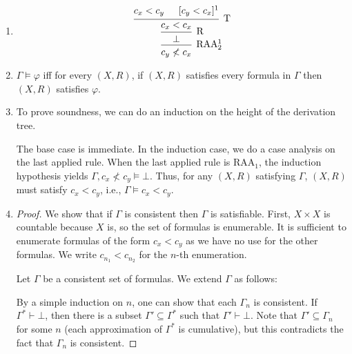 \documentclass[a4paper]{article}
\newcommand{\N}{\mathbb{N}}
\begin{document}
\section{}
\begin{enumerate}
\item
  \[\begin{prooftree}
      \hypo{c_{x} < c_{y}}
      \hypo{[c_{y} < c_{x}]^1}
      \infer2[T]{c_{x} < c_{x}}
      \infer1[R]{\bot}
      \infer1[RAA$_{2}^1$]{c_{y} \nless c_{x}}
    \end{prooftree}\]
\item
  $\Gamma \vDash \varphi$ iff for every $(X,R)$, if $(X,R)$ satisfies every formula in $\Gamma$ then $(X,R)$ satisfies $\varphi$.
\item To prove soundness, we can do an induction on the height of the derivation tree.
  
  The base case is immediate.
  In the induction case, we do a case analysis on the last applied rule.
  When the last applied rule is $\text{RAA}_{1}$, the induction hypothesis yields $\Gamma,c_{x} \nless c_{y} \vDash \bot$.
  Thus, for any $(X,R)$ satisfying $\Gamma$, $(X,R)$ must satisfy $c_{x} < c_{y}$, i.e., $\Gamma \vDash c_{x} < c_{y}$.
\item 
  \begin{proof}
    We show that if $\Gamma$ is consistent then $\Gamma$ is satisfiable.
    First, $X \times X$ is countable because $X$ is, so the set of formulas is enumerable.
    It is sufficient to enumerate formulas of the form $c_{x} < c_{y}$ as we have no use for the other formulas.
    We write $c_{n_1} < c_{n_2}$ for the $n$-th enumeration.

    Let $\Gamma$ be a consistent set of formulas.
    We extend $\Gamma$ as follows:
    By a simple induction on $n$, one can show that each $\Gamma_{n}$ is consistent.
    If $\Gamma^{*} \vdash \bot$, then there is a subset $\Gamma' \subseteq \Gamma^{*}$ such that $\Gamma' \vdash \bot$.
    Note that $\Gamma' \subseteq \Gamma_{n}$ for some $n$ (each approximation of $\Gamma^{*}$ is cumulative), but this contradicts the fact that $\Gamma_{n}$ is consistent.
    

\end{proof}
\end{enumerate}
\end{document}
